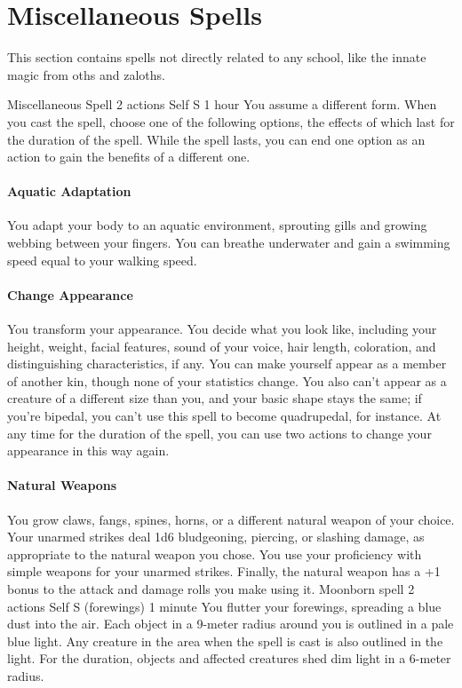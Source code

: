 \section{Miscellaneous Spells}
This section contains spells not directly related to any school, like the innate magic from oths and zaloths.

    {Miscellaneous Spell}
    {2 actions}
    {Self}
    {S}
    {1 hour}
    You assume a different form.
    When you cast the spell, choose one of the following options, the effects of which last for the duration of the spell.
    While the spell lasts, you can end one option as an action to gain the benefits of a different one.

    \paragraph{Aquatic Adaptation}
        You adapt your body to an aquatic environment, sprouting gills and growing webbing between your fingers.
        You can breathe underwater and gain a swimming speed equal to your walking speed.

    \paragraph{Change Appearance}
        You transform your appearance.
        You decide what you look like, including your height, weight, facial features, sound of your voice, hair length, coloration, and distinguishing characteristics, if any.
        You can make yourself appear as a member of another kin, though none of your statistics change.
        You also can't appear as a creature of a different size than you, and your basic shape stays the same; if you're bipedal, you can't use this spell to become quadrupedal, for instance.
        At any time for the duration of the spell, you can use two actions to change your appearance in this way again.

    \paragraph{Natural Weapons}
        You grow claws, fangs, spines, horns, or a different natural weapon of your choice.
        Your unarmed strikes deal 1d6 bludgeoning, piercing, or slashing damage, as appropriate to the natural weapon you chose.
        You use your proficiency with simple weapons for your unarmed strikes.
        Finally, the natural weapon has a +1 bonus to the attack and damage rolls you make using it.
    {Moonborn spell}
    {2 actions}
    {Self}
    {S (forewings)}
    {1 minute}
    You flutter your forewings, spreading a blue dust into the air.
    Each object in a 9-meter radius around you is outlined in a pale blue light.
    Any creature in the area when the spell is cast is also outlined in the light.
    For the duration, objects and affected creatures shed dim light in a 6-meter radius.

